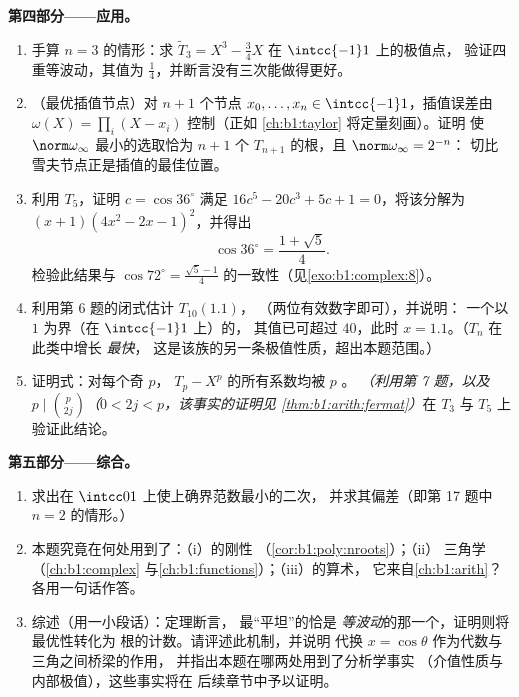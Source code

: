 \begin{problem}
\medskip
\noindent\textbf{第四部分——应用。}
\begin{enumerate}[resume]
  \item 手算 $n = 3$ 的情形：求
        $\widetilde T_3 = X^3 - \frac34X$ 在 $\intcc{-1}1$ 上的极值点，
        验证四重等波动，其值为
        $\frac14$，并断言没有三次能做得更好。
  \item （最优插值节点）对 $n + 1$ 个节点 $x_0,
        \dots, x_n \in \intcc{-1}1$，插值误差由
        $\omega(X) = \prod_i (X - x_i)$ 控制（正如
        \cref{ch:b1:taylor} 将定量刻画）。证明
        使 $\norm\omega_\infty$ 最小的选取恰为 $n + 1$ 个
        $T_{n+1}$ 的根，且 $\norm\omega_\infty = 2^{-n}$：
        切比雪夫节点正是插值的最佳位置。
  \item 利用 $T_5$，证明 $c = \cos 36^\circ$ 满足
        $16c^5 - 20c^3 + 5c + 1 = 0$，将该分解为
        $(x + 1)(4x^2 - 2x - 1)^2$，并得出
        \[
        \cos 36^\circ = \frac{1 + \sqrt5}4 .
        \]
        检验此结果与 $\cos 72^\circ =
        \frac{\sqrt5 - 1}4$ 的一致性（见\cref{exo:b1:complex:8}）。
  \item 利用第 6 题的闭式估计 $T_{10}(1.1)$，
        （两位有效数字即可），并说明：
        一个以 $1$ 为界（在 $\intcc{-1}1$ 上）的，
        其值已可超过 $40$，此时 $x = 1.1$。（$T_n$ 在此类中增长
        \emph{最快}，
        这是该族的另一条极值性质，超出本题范围。）
  \item 证明式：对每个奇 $p$，
        $T_p - X^p$ 的所有系数均被 $p$ 。
        \emph{（利用第 7 题，以及 $p \mid \binom p{2j}$（$0 <
        2j < p$，该事实的证明见
        \cref{thm:b1:arith:fermat}）}在 $T_3$ 与 $T_5$ 上验证此结论。
\end{enumerate}

\medskip
\noindent\textbf{第五部分——综合。}
\begin{enumerate}[resume]
  \item 求出在 $\intcc01$ 上使上确界范数最小的二次，
        并求其偏差（即第 17 题中
        $n = 2$ 的情形。）
  \item 本题究竟在何处用到了：（i）的刚性
        （\cref{cor:b1:poly:nroots}）；（ii）
        三角学（\cref{ch:b1:complex}
        与\cref{ch:b1:functions}）；（iii）的算术，
        它来自\cref{ch:b1:arith}？各用一句话作答。
  \item 综述（用一小段话）：定理断言，
        最“平坦”的恰是
        \emph{等波动}的那一个，证明则将最优性转化为
        根的计数。请评述此机制，并说明
        代换 $x = \cos\theta$ 作为代数与三角之间桥梁的作用，
        并指出本题在哪两处用到了分析学事实
        （介值性质与内部极值），这些事实将在
        后续章节中予以证明。
\end{enumerate}
\end{problem}
